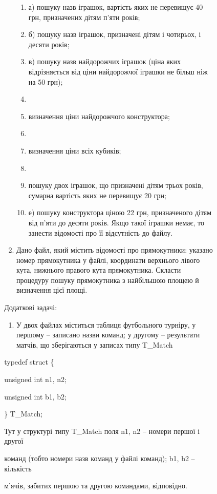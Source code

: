 \documentclass[]{article}
\makeatletter
\newcommand{\xslalph}[1]{\expandafter\@xslalph\csname c@#1\endcsname}
\newcommand{\@xslalph}[1]{%
    \ifcase#1\or а\or б\or в\or г\or д\or e\or є\or ж\or з\or i%
    \or й\or к\or л\or м\or н\or о\or п\or р\or с\or т%
    \or у\or ф\or х\or ц\or ч\or ш\or ю\or я\or аа\or бб\or вв%
    \else\@ctrerr\fi%
}
\makeatother
\begin{document}
\begin{enumerate}
\begin{enumerate}[label=\xslalph*)]
\begin{enumerate}
\begin{enumerate}[label=\xslalph*)]
\begin{enumerate}
\begin{enumerate}[label=\xslalph*)]
\item
а) пошуку назв іграшок, вартість яких не перевищує 40 грн, призначених
дітям п'яти років;
\item
б) пошуку назв іграшок, призначені дітям і чотирьох, і десяти років;
\item
в) пошуку назв найдорожчих іграшок (ціна яких відрізняється від ціни
найдорожчої іграшки не більш ніж на 50 грн);
\item\item визначення ціни найдорожчого конструктора;
\item\item визначення ціни всіх кубиків;
\item\item пошуку двох іграшок, що призначені дітям трьох років, сумарна
вартість яких не перевищує 20 грн;
\item
е) пошуку конструктора ціною 22 грн, призначеного дітям від п'яти до
десяти років. Якщо такої іграшки немає, то занести відомості про її
відсутність до файлу.
\end{enumerate}


\item
  Дано файл, який містить відомості про прямокутники: указано номер
  прямокутника у файлі, координати верхнього лівого кута, нижнього
  правого кута прямокутника. Скласти процедуру пошуку прямокутника з
  найбільшою площею й визначення цієї площі.
\end{enumerate}

Додаткові задачі:

\begin{enumerate}
\def\labelenumi{\arabic{enumi})}
\item
  У двох файлах міститься таблиця футбольного турніру, у першому --
  записано назви команд; у другому -- результати матчів, що зберігаються
  у записах типу T\_Match
\end{enumerate}

typedef struct \{

unsigned int n1, n2;

unsigned int b1, b2;

\} T\_Match;

Тут у структурі типу T\_Match поля n1, n2 -- номери першої і другої

команд (тобто номери назв команд у файлі команд); b1, b2 -- кількість

м'ячів, забитих першою та другою командами, відповідно.


\end{enumerate}
\end{enumerate}
\end{enumerate}
\end{enumerate}
\end{document}
